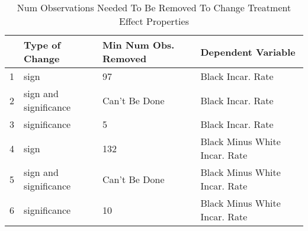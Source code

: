 \begin{table}[ht]
\centering \footnotesize
\caption{Num Observations Needed To Be Removed To Change Treatment Effect Properties}
\begin{tabular}{rlll}
  \noalign{\smallskip \smallskip} \hline 
 & Type of Change & Min Num Obs. Removed & Dependent Variable \\
  \hline
1 & sign & 97 & Black Incar. Rate \\
  2 & sign and significance & Can't Be Done & Black Incar. Rate \\
  3 & significance & 5 & Black Incar. Rate \\
  4 & sign & 132 & Black Minus White Incar. Rate \\
  5 & sign and significance & Can't Be Done & Black Minus White Incar. Rate \\
  6 & significance & 10 & Black Minus White Incar. Rate \\
   \hline
\end{tabular}
\label{table_mip}
\end{table}
